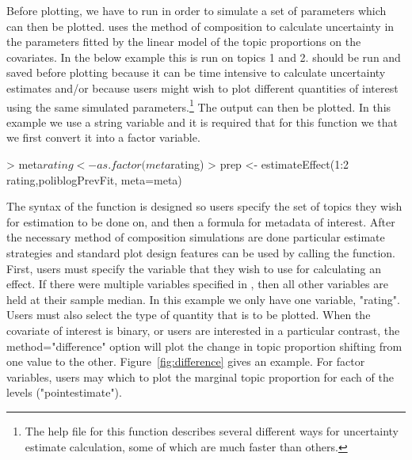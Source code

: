 \documentclass[nojss]{jss}
\begin{document}
Before plotting, we have to run  in order to simulate a set of parameters which can then be plotted.   uses the method of composition to calculate uncertainty in the parameters fitted by the linear model of the topic proportions on the covariates.  In the below example this is run on topics 1 and 2.  should be run and saved before plotting because it can be time intensive to calculate uncertainty estimates and/or because users might wish to plot different quantities of interest using the same simulated parameters.\footnote{The help file for this function describes several different ways for uncertainty estimate calculation, some of which are much faster than others.} The output can then be plotted. In this example we use a string variable and it is required that for this function we that we first convert it into a factor variable.

\begin{Schunk}
\begin{Sinput}
> meta$rating<-as.factor(meta$rating)
> prep <- estimateEffect(1:2 ~ rating,poliblogPrevFit, meta=meta)
\end{Sinput}
\end{Schunk}

The syntax of the  function is designed so users specify the set of topics they wish for estimation to be done on, and then a formula for metadata of interest. After the necessary method of composition simulations are done particular estimate strategies and standard plot design features can be used by calling the  function. First, users must specify the variable that they wish to use for calculating an effect. If there were multiple variables specified in , then all other variables are held at their sample median. In this example we only have one variable, "rating". Users must also select the type of quantity that is to be plotted. When the covariate of interest is binary, or users are interested in a particular contrast, the method="difference" option will plot the change in topic proportion shifting from one value to the other. Figure~\ref{fig:difference} gives an example. For factor variables, users may which to plot the marginal topic proportion for each of the levels ("pointestimate").
\end{document}

